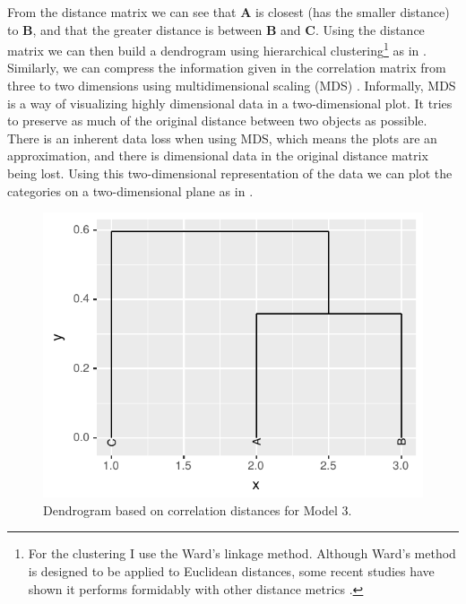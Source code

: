 From the distance matrix we can see that \textbf{A} is closest (has the smaller distance) to \textbf{B}, and that the greater distance is between \textbf{B} and \textbf{C}. Using the distance matrix we can then build a dendrogram using hierarchical clustering\footnote{For the clustering I use the Ward's linkage method. Although Ward's method \autocite{Murtagh.2014} is designed to be applied to Euclidean distances, some recent studies have shown it performs formidably with other distance metrics \autocites{Meyniel.2010, Strauss.2017}.} \autocite{Rokach.2005} as in . Similarly, we can compress the information given in the correlation matrix from three to two dimensions using multidimensional scaling (MDS) \autocite{Borg.2005, Cysouw.2007c}. Informally, MDS is a way of visualizing highly dimensional data in a two-dimensional plot. It tries to preserve as much of the original distance between two objects as possible. There is an inherent data loss when using MDS, which means the plots are an approximation, and there is dimensional data in the original distance matrix being lost. Using this two-dimensional representation of the data we can plot the categories on a two-dimensional plane as in .

\begin{figure}[!htpb]
  \centering
  \includegraphics{./figures/fake/dendro3.pdf}
  \caption{Dendrogram based on correlation distances for Model 3.}\label{fig:dendro-model3}
\end{figure}

